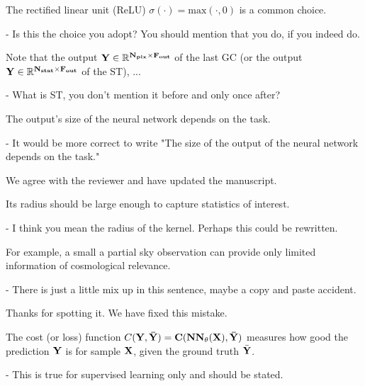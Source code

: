 \documentclass[12pt,a4paper]{article}
\newcommand{\nati}[1]{{\color[rgb]{.1,.6,.1}{NP: #1}}}
\newcommand{\todo}[1]{{\color[rgb]{.6,.1,.6}{TODO: #1}}}
\newcommand{\1}{\b{1}}              %
\newcommand{\0}{\b{0}}              %
\begin{document}
\begin{mdframed}[style=comment]
The rectified linear unit (ReLU) $\sigma(\cdot) = \textrm{max}(\cdot, 0)$ is a common choice.

- Is this the choice you adopt? You should mention that you do, if you indeed do.
\end{mdframed}
\todo{Assigned: @michael}

\begin{mdframed}[style=comment]
Note that the output $\bf{Y}\in\mathbb{R}^{N_{pix}\times F_{out}}$ of the last GC (or the output $\bf{Y}\in\mathbb{R}^{N_{stat}\times F_{out}}$ of the ST), ...

- What is ST, you don't mention it before and only once after?
\end{mdframed}
\todo{Assigned: @michael}

\begin{mdframed}[style=comment]
The output’s size of the neural network depends on the task.

- It would be more correct to write "The size of the output of the neural network depends on the task."
\end{mdframed}
We agree with the reviewer and have updated the manuscript.

\begin{mdframed}[style=comment]
Its radius should be large enough to capture statistics of interest.

- I think you mean the radius of the kernel. Perhaps this could be rewritten.
\end{mdframed}
\todo{Assigned: @all}
\nati{The manuscript seems clear to me. But let me know if you think otherwise.}

\begin{mdframed}[style=comment]
For example, a small a partial sky observation can provide only limited information of cosmological relevance.

- There is just a little mix up in this sentence, maybe a copy and paste accident.
\end{mdframed}
Thanks for spotting it. We have fixed this mistake.

\begin{mdframed}[style=comment]
The cost (or loss) function $C(\bf{Y},\bar{\bf{Y}}) = C(NN_\theta(\bf{X}),\bar{\bf{Y}})$ measures how good the prediction $\bf{Y}$ is for sample $\bf{X}$, given the ground truth $\bar{\bf{Y}}$.

- This is true for supervised learning only and should be stated.
\end{mdframed}
\todo{Assigned: @michael, @nati}
\nati{In an unsupervised setting, this can just not be computed... Specifying it seems redundant to me.}
\end{document}
